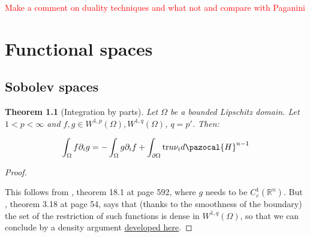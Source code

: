 \documentclass[english,a4paper,10pt,oneside]{scrbook}	%
\theoremstyle{break}
\newtheorem{thm}[equation]{Theorem}
\newenvironment{mproof}[1][\proofname]{%
  \begin{proof}[#1]$ $\par\nobreak\ignorespaces
}{%
  \end{proof}
}
\renewcommand*{\proofname}{Proof}
\theoremstyle{remark}
\newcommand{\mR}{\mathbb{R}}
\newcommand{\tr}{\text{tr}}
\begin{document}
\textcolor{red}{Make a comment on duality techniques and what not and compare with Paganini}

\appendix

\chapter{Functional spaces}
\section{Sobolev spaces}

\begin{thm}[Integration by parts]
\label{thm:ibp}
Let $\Omega$ be a bounded Lipschitz domain. Let $1<p<\infty$ and $f,g \in W^{1,p}(\Omega), W^{1,q}(\Omega)$, $q=p'$. Then:

$$\int_\Omega f \partial_i g = -\int_\Omega g \partial_i f+\int_{\partial \Omega} \tr u \nu_i d\pazocal{H}^{n-1}$$
\end{thm}
\begin{mproof}

This follows from \cite{leoni}, theorem 18.1 at page 592, where $g$ needs to be $C^1_c(\mR^n)$. But \cite{adams}, theorem 3.18 at page 54, says that (thanks to the smoothness of the boundary) the set of the restriction of such functions is dense in $W^{1,q}(\Omega)$, so that we can conclude by a density argument \textcolor{red}{\href{https://www.math.kit.edu/iana2/lehre/sobolevspaces2021s/media/lec15.pdf}{developed here}}.

\end{mproof}
\end{document}
